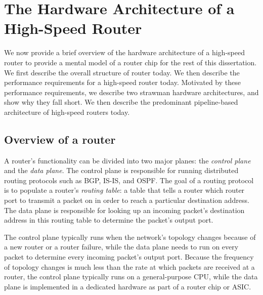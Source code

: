 \section{The Hardware Architecture of a High-Speed Router}
\label{s:router_arch}

We now provide a brief overview of the hardware architecture of a high-speed
router to provide a mental model of a router chip for the rest of this
dissertation. We first describe the overall structure of router today. We then
describe the performance requirements for a high-speed router today. Motivated
by these performance requirements, we describe two strawman hardware
architectures, and show why they fall short. We then describe the predominant
pipeline-based architecture of high-speed routers today.

\subsection{Overview of a router}

A router's functionality can be divided into two major planes: the {\em control
plane} and the {\em data plane}. The control plane is responsible for running
distributed routing protocols such as BGP, IS-IS, and OSPF. The goal of a
routing protocol is to populate a router's {\em routing table}: a table that
tells a router which router port to transmit a packet on in order to reach a
particular destination address. The data plane is responsible for looking up an
incoming packet's destination address in this routing table to determine the
packet's output port.

The control plane typically runs when the network's topology changes because of
a new router or a router failure, while the data plane needs to run on every
packet to determine every incoming packet's output port. Because the frequency
of topology changes is much less than the rate at which packets are received at
a router, the control plane typically runs on a general-purpose CPU, while the
data plane is implemented in a dedicated hardware as part of a router chip or
ASIC.


